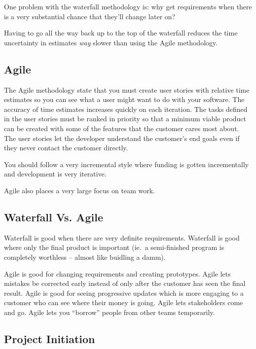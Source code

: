 One problem with the waterfall methodology is: why get requirements when there is a very substantial chance that they'll change later on?

Having to go all the way back up to the top of the waterfall reduces the time uncertainty in estimates \emph{way} slower than using the Agile methodology.

\subsection{Agile}\label{sub:agile}

The Agile methodology state that you must create user stories with relative time estimates so you can see what a user might want to do with your software.
The accuracy of time estimates increases quickly on each iteration.
The tasks defined in the user stories must be ranked in priority so that a minimum viable product can be created with some of the features that the customer cares most about.
The user stories let the developer understand the customer's end goals even if they never contact the customer directly.

You should follow a very incremental style where funding is gotten incrementally and development is very iterative.

Agile also places a very large focus on team work.

\subsection{Waterfall Vs. Agile}\label{sub:waterfall_vs_agile}

Waterfall is good when there are very definite requirements.
Waterfall is good where only the final product is important (ie.\ a semi-finished program is completely worthless -- almost like buidling a damm).

Agile is good for changing requirements and creating prototypes.
Agile lets mistakes be corrected early instead of only after the customer has seen the final result.
Agile is good for seeing progressive updates which is more engaging to a customer who can see where their money is going.
Agile lets stakeholders come and go.
Agile lets you ``borrow'' people from other teams temporarily.

\subsection{Project Initiation}\label{sub:project_initiation_one}

